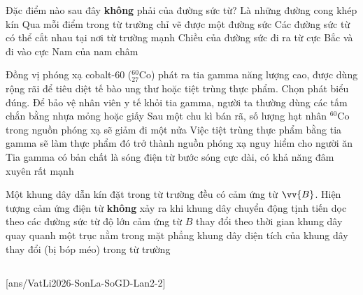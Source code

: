 	\begin{ex}%
		Đặc điểm nào sau đây \textbf{không} phải của đường sức từ?
		\choice
		{Là những đường cong khép kín}
		{Qua mỗi điểm trong từ trường chỉ vẽ được một đường sức}
		{\True Các đường sức từ có thể cắt nhau tại nơi từ trường mạnh}
		{Chiều của đường sức đi ra từ cực Bắc và đi vào cực Nam của nam châm}
	\end{ex}

	\begin{ex}%
		Đồng vị phóng xạ cobalt-60 (${}^{60}_{27}\text{Co}$) phát ra tia gamma năng lượng cao, được dùng rộng rãi để tiêu diệt tế bào ung thư hoặc tiệt trùng thực phẩm. Chọn phát biểu đúng.
		\choice
		{Để bảo vệ nhân viên y tế khỏi tia gamma, người ta thường dùng các tấm chắn bằng nhựa mỏng hoặc giấy}
		{\True Sau một chu kì bán rã, số lượng hạt nhân ${}^{60}\text{Co}$ trong nguồn phóng xạ sẽ giảm đi một nửa}
		{Việc tiệt trùng thực phẩm bằng tia gamma sẽ làm thực phẩm đó trở thành nguồn phóng xạ nguy hiểm cho người ăn}
		{Tia gamma có bản chất là sóng điện từ bước sóng cực dài, có khả năng đâm xuyên rất mạnh}
	\end{ex}

	\begin{ex}%
		Một khung dây dẫn kín đặt trong từ trường đều có cảm ứng từ $\vv{B}$. Hiện tượng cảm ứng điện từ \textbf{không} xảy ra khi
		\choice
		{\True khung dây chuyển động tịnh tiến dọc theo các đường sức từ}
		{độ lớn cảm ứng từ $B$ thay đổi theo thời gian}
		{khung dây quay quanh một trục nằm trong mặt phẳng khung dây}
		{diện tích của khung dây thay đổi (bị bóp méo) trong từ trường}
	\end{ex}

	\subsection*{}
	\setcounter{ex}{0}
	[ans/VatLi2026-SonLa-SoGD-Lan2-2]

